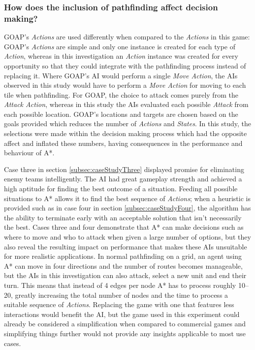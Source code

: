 \documentclass[11pt, a4paper]{report}
\begin{document}
\subsubsection{How does the inclusion of pathfinding affect decision making?}

GOAP's \emph{Actions} are used differently when compared to the \emph{Actions} in this game: GOAP's \emph{Actions} are simple and only one instance is created for each type of \emph{Action}, whereas in this investigation an \emph{Action} instance was created for every opportunity so that they could integrate with the pathfinding process instead of replacing it. Where GOAP's AI would perform a single \emph{Move Action}, the AIs observed in this study would have to perform a \emph{Move Action} for moving to each tile when pathfinding. For GOAP, the choice to attack comes purely from the \emph{Attack Action}, whereas in this study the AIs evaluated each possible \emph{Attack} from each possible location. GOAP's locations and targets are chosen based on the goals provided which reduces the number of \emph{Actions} and \emph{States}. In this study, the selections were made within the decision making process which had the opposite affect and inflated these numbers, having consequences in the performance and behaviour of A*.

Case three in section \ref{subsec:caseStudyThree} displayed promise for eliminating enemy teams intelligently. The AI had great gameplay strength and achieved a high aptitude for finding the best outcome of a situation. Feeding all possible situations to A* allows it to find the best sequence of \emph{Actions}; when a heuristic is provided such as in case four in section \ref{subsec:caseStudyFour}, the algorithm has the ability to terminate early with an acceptable solution that isn't necessarily the best. Cases three and four demonstrate that A* can make decisions such as where to move and who to attack when given a large number of options, but they also reveal the resulting impact on performance that makes these AIs unsuitable for more realistic applications. In normal pathfinding on a grid, an agent using A* can move in four directions and the number of routes becomes manageable, but the AIs in this investigation can also attack, select a new unit and end their turn. This means that instead of 4 edges per node A* has to process roughly 10--20, greatly increasing the total number of nodes and the time to process a suitable sequence of \emph{Actions}. Replacing the game with one that features less interactions would benefit the AI, but the game used in this experiment could already be considered a simplification when compared to commercial games and simplifying things further would not provide any insights applicable to most use cases.
\end{document}
